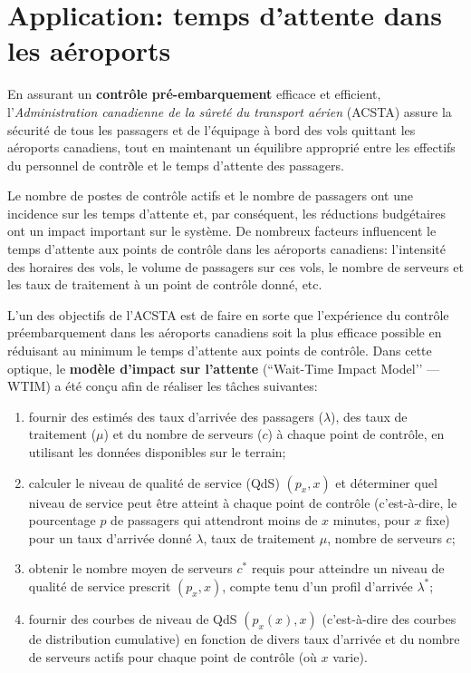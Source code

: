 \section{Application: temps d'attente dans les aéroports}
En assurant un \textbf{contrôle pré-embarquement} efficace et efficient, l'\textit{Administration canadienne de la sûreté du transport aérien} (ACSTA) assure la sécurité de tous les passagers et de l'équipage à bord des vols quittant les aéroports canadiens, tout en maintenant un équilibre approprié entre les effectifs du personnel de contrðle et le temps d'attente des passagers. \par Le nombre de postes de contrôle actifs et le nombre de passagers ont une incidence sur les temps d'attente et, par conséquent, les réductions budgétaires ont un impact important sur le système.\newl
De nombreux facteurs influencent le temps d'attente aux points de contrôle dans les aéroports canadiens: l'intensité des horaires des vols, le volume de passagers sur ces vols, le nombre de serveurs et les taux de traitement à un point de contrôle donné, etc. \par L'un des objectifs de l'ACSTA est de faire en sorte que l'expérience du contrôle préembarquement dans les aéroports canadiens soit la plus efficace possible en réduisant au minimum le temps d'attente aux points de contrôle. Dans cette optique, le \textbf{modèle d’impact sur l’attente} (``Wait-Time Impact Model'’ — WTIM) a été conçu afin de réaliser les tâches suivantes: 
\begin{enumerate}[noitemsep]
\item fournir des estimés des taux d'arrivée des passagers ($\lambda$), des taux de traitement ($\mu$) et du nombre de serveurs ($c$) à chaque point de contrôle, en utilisant les données disponibles sur le terrain;
\item calculer le niveau de qualité de service (QdS) $(p_x,x)$ et déterminer quel niveau de service peut être atteint à chaque point de contrôle (c'est-à-dire, le pourcentage $p$ de passagers qui attendront moins de $x$ minutes, pour $x$ fixe) pour un taux d'arrivée donné $\lambda$, taux de traitement $\mu$, nombre de serveurs $c$;
\item obtenir le nombre moyen de serveurs $c^*$ requis pour atteindre un niveau de qualité de service prescrit $(p_x,x)$, compte tenu d'un profil d'arrivée $\lambda^*$;
\item fournir des courbes de niveau de QdS $(p_x(x),x)$ (c'est-à-dire des courbes de distribution cumulative) en fonction de divers taux d'arrivée et du nombre de serveurs actifs pour chaque point de contrôle (où $x$ varie).\end{enumerate}
